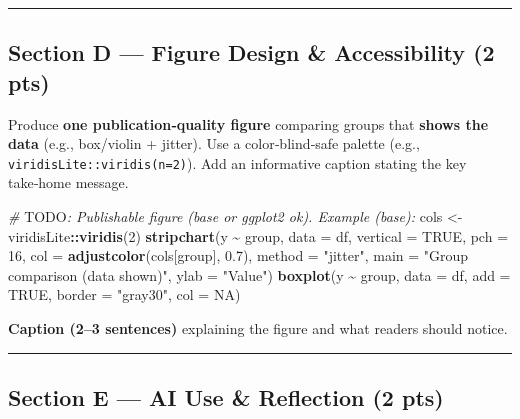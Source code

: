 \documentclass[
  11pt,
]{article}
\newenvironment{Shaded}{\begin{snugshade}}{\end{snugshade}}
\newcommand{\AlertTok}[1]{\textcolor[rgb]{0.94,0.16,0.16}{#1}}
\newcommand{\AttributeTok}[1]{\textcolor[rgb]{0.13,0.29,0.53}{#1}}
\newcommand{\CommentTok}[1]{\textcolor[rgb]{0.56,0.35,0.01}{\textit{#1}}}
\newcommand{\ConstantTok}[1]{\textcolor[rgb]{0.56,0.35,0.01}{#1}}
\newcommand{\DecValTok}[1]{\textcolor[rgb]{0.00,0.00,0.81}{#1}}
\newcommand{\FloatTok}[1]{\textcolor[rgb]{0.00,0.00,0.81}{#1}}
\newcommand{\FunctionTok}[1]{\textcolor[rgb]{0.13,0.29,0.53}{\textbf{#1}}}
\newcommand{\NormalTok}[1]{#1}
\newcommand{\OtherTok}[1]{\textcolor[rgb]{0.56,0.35,0.01}{#1}}
\newcommand{\SpecialCharTok}[1]{\textcolor[rgb]{0.81,0.36,0.00}{\textbf{#1}}}
\newcommand{\StringTok}[1]{\textcolor[rgb]{0.31,0.60,0.02}{#1}}
\begin{document}
\begin{center}\rule{0.5\linewidth}{0.5pt}\end{center}

\subsection{Section D --- Figure Design \& Accessibility (2
pts)}\label{section-d-figure-design-accessibility-2-pts}

Produce \textbf{one publication‑quality figure} comparing groups that
\textbf{shows the data} (e.g., box/violin + jitter). Use a
color‑blind‑safe palette (e.g., \texttt{viridisLite::viridis(n=2)}). Add
an informative caption stating the key take‑home message.

\begin{Shaded}
\begin{Highlighting}[]
\CommentTok{\# }\AlertTok{TODO}\CommentTok{: Publishable figure (base or ggplot2 ok). Example (base):}
\NormalTok{cols }\OtherTok{\textless{}{-}}\NormalTok{ viridisLite}\SpecialCharTok{::}\FunctionTok{viridis}\NormalTok{(}\DecValTok{2}\NormalTok{)}
\FunctionTok{stripchart}\NormalTok{(y }\SpecialCharTok{\textasciitilde{}}\NormalTok{ group, }\AttributeTok{data =}\NormalTok{ df, }\AttributeTok{vertical =} \ConstantTok{TRUE}\NormalTok{, }\AttributeTok{pch =} \DecValTok{16}\NormalTok{, }\AttributeTok{col =} \FunctionTok{adjustcolor}\NormalTok{(cols[group], }\FloatTok{0.7}\NormalTok{), }\AttributeTok{method =} \StringTok{"jitter"}\NormalTok{, }\AttributeTok{main =} \StringTok{"Group comparison (data shown)"}\NormalTok{, }\AttributeTok{ylab =} \StringTok{"Value"}\NormalTok{)}
\FunctionTok{boxplot}\NormalTok{(y }\SpecialCharTok{\textasciitilde{}}\NormalTok{ group, }\AttributeTok{data =}\NormalTok{ df, }\AttributeTok{add =} \ConstantTok{TRUE}\NormalTok{, }\AttributeTok{border =} \StringTok{"gray30"}\NormalTok{, }\AttributeTok{col =} \ConstantTok{NA}\NormalTok{)}
\end{Highlighting}
\end{Shaded}

\textbf{Caption (2--3 sentences)} explaining the figure and what readers
should notice.

\begin{center}\rule{0.5\linewidth}{0.5pt}\end{center}

\subsection{Section E --- AI Use \& Reflection (2
pts)}\label{section-e-ai-use-reflection-2-pts}
\end{document}
